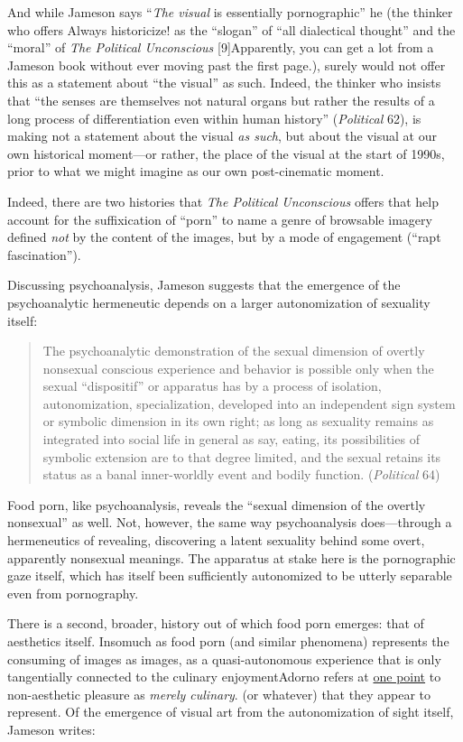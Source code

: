 \documentclass[
  12pt,
]{article}
\begin{document}
And while Jameson says ``\emph{The visual} is essentially pornographic''
he (the thinker who offers Always historicize! as the ``slogan'' of
``all dialectical thought'' and the ``moral'' of \emph{The Political
Unconscious} {[}9{]}{Apparently, you can get a lot from a Jameson book
without ever moving past the first page.}), surely would not offer this
as a statement about ``the visual'' as such. Indeed, the thinker who
insists that ``the senses are themselves not natural organs but rather
the results of a long process of differentiation even within human
history'' (\emph{Political} 62), is making not a statement about the
visual \emph{as such}, but about the visual at our own historical
moment---or rather, the place of the visual at the start of 1990s, prior
to what we might imagine as our own post-cinematic moment.

Indeed, there are two histories that \emph{The Political Unconscious}
offers that help account for the suffixication of ``porn'' to name a
genre of browsable imagery defined \emph{not} by the content of the
images, but by a mode of engagement (``rapt fascination'').

Discussing psychoanalysis, Jameson suggests that the emergence of the
psychoanalytic hermeneutic depends on a larger autonomization of
sexuality itself:

\begin{quote}
The psychoanalytic demonstration of the sexual dimension of overtly
nonsexual conscious experience and behavior is possible only when the
sexual ``dispositif'' or apparatus has by a process of isolation,
autonomization, specialization, developed into an independent sign
system or symbolic dimension in its own right; as long as sexuality
remains as integrated into social life in general as say, eating, its
possibilities of symbolic extension are to that degree limited, and the
sexual retains its status as a banal inner-worldly event and bodily
function. (\emph{Political} 64)
\end{quote}

Food porn, like psychoanalysis, reveals the ``sexual dimension of the
overtly nonsexual'' as well. Not, however, the same way psychoanalysis
does---through a hermeneutics of revealing, discovering a latent
sexuality behind some overt, apparently nonsexual meanings. The
apparatus at stake here is the pornographic gaze itself, which has
itself been sufficiently autonomized to be utterly separable even from
pornography.

There is a second, broader, history out of which food porn emerges: that
of aesthetics itself. Insomuch as food porn (and similar phenomena)
represents the consuming of images as images, as a quasi-autonomous
experience that is only tangentially connected to the culinary
enjoyment{Adorno refers at
\href{http://books.google.com/books?id=Wk_NFsGTkncC\&lpg=PA212\&dq=\%22merely\%20culinary\%22\%20inauthor\%3Aadorno\&pg=PA212\#v=onepage\&q=\%22merely\%20culinary\%22\%20inauthor:adorno\&f=false}{one
point} to non-aesthetic pleasure as \emph{merely culinary}.} (or
whatever) that they appear to represent. Of the emergence of visual art
from the autonomization of sight itself, Jameson writes:
\end{document}
